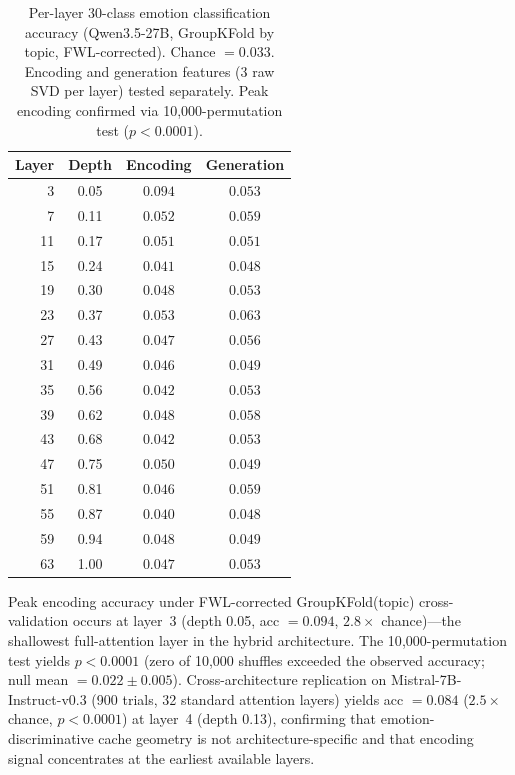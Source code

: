\documentclass[11pt,a4paper]{article}
\begin{document}
\begin{table}[H]
\centering
\caption{Per-layer 30-class emotion classification accuracy (Qwen3.5-27B, GroupKFold by topic, FWL-corrected). Chance $= 0.033$. Encoding and generation features (3 raw SVD per layer) tested separately. Peak encoding confirmed via 10{,}000-permutation test ($p < 0.0001$).}
\label{tab:classification}
\begin{tabular}{rccc}
\toprule
\textbf{Layer} & \textbf{Depth} & \textbf{Encoding} & \textbf{Generation} \\
\midrule
 3 & 0.05 & $\mathbf{0.094}$ & $0.053$ \\
 7 & 0.11 & $0.052$ & $0.059$ \\
11 & 0.17 & $0.051$ & $0.051$ \\
15 & 0.24 & $0.041$ & $0.048$ \\
19 & 0.30 & $0.048$ & $0.053$ \\
23 & 0.37 & $0.053$ & $\mathbf{0.063}$ \\
27 & 0.43 & $0.047$ & $0.056$ \\
31 & 0.49 & $0.046$ & $0.049$ \\
35 & 0.56 & $0.042$ & $0.053$ \\
39 & 0.62 & $0.048$ & $0.058$ \\
43 & 0.68 & $0.042$ & $0.053$ \\
47 & 0.75 & $0.050$ & $0.049$ \\
51 & 0.81 & $0.046$ & $0.059$ \\
55 & 0.87 & $0.040$ & $0.048$ \\
59 & 0.94 & $0.048$ & $0.049$ \\
63 & 1.00 & $0.047$ & $0.053$ \\
\bottomrule
\end{tabular}
\end{table}

Peak encoding accuracy under FWL-corrected GroupKFold(topic) cross-validation occurs at layer~3 (depth 0.05, acc $= 0.094$, $2.8\times$ chance)---the shallowest full-attention layer in the hybrid architecture. The 10{,}000-permutation test yields $p < 0.0001$ (zero of 10{,}000 shuffles exceeded the observed accuracy; null mean $= 0.022 \pm 0.005$). Cross-architecture replication on Mistral-7B-Instruct-v0.3 (900 trials, 32 standard attention layers) yields acc $= 0.084$ ($2.5\times$ chance, $p < 0.0001$) at layer~4 (depth 0.13), confirming that emotion-discriminative cache geometry is not architecture-specific and that encoding signal concentrates at the earliest available layers.
\end{document}
